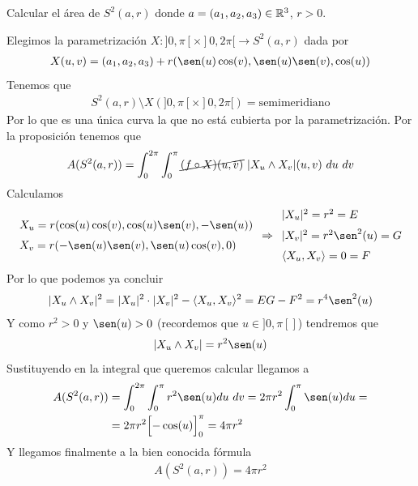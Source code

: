 \begin{ejemplo}
    Calcular el área de $S^2(a,r)$ donde $a=(a_1, a_2, a_3)\in \mathbb{R}^3$, $r>0$.\\
    \begin{solucion}
        Elegimos la parametrización $X:]0,\pi[\times]0,2\pi[ \to S^2(a,r)$ dada por
        \begin{gather*}
            X(u,v) = (a_1,a_2,a_3) + r(\sen(u)\cos(v), \sen(u)\sen(v), \cos(u))
        \end{gather*}
        Tenemos que 
        \begin{gather*}
            S^2(a,r) \setminus X(]0,\pi[\times]0,2\pi[) = \text{semimeridiano}
        \end{gather*}
        Por lo que es una única curva la que no está cubierta por la parametrización. Por la proposición tenemos que 
        \begin{gather*}
            A(S^2(a,r)) = \int_0^{2\pi} \int_0^{\pi} \cancel{(f\circ X)(u,v)}\ |X_u\wedge X_v|(u,v)\ du\ dv
        \end{gather*}
        Calculamos
        \begin{gather*}
            \begin{array}{l}
                X_u = r(\cos(u)\cos(v), \cos(u)\sen(v), -\sen(u))\\[0.6em]
                X_v = r(-\sen(u)\sen(v), \sen(u)\cos(v), 0)
            \end{array} \Rightarrow 
            \begin{array}{l}
                |X_u|^2 = r^2 = E\\[0.6em]
                |X_v|^2 = r^2\sen^2(u) = G\\[0.6em]
                \langle X_u, X_v \rangle = 0 = F
            \end{array}
        \end{gather*}
        Por lo que podemos ya concluir 
        \begin{gather*}
            |X_u\wedge X_v|^2 = |X_u|^2 \cdot |X_v|^2 - \langle X_u, X_v \rangle^2 = EG - F^2 = r^4\sen^2(u)
        \end{gather*}
        Y como $r^2>0$ y $\sen(u)>0$ (recordemos que $u\in]0,\pi[]$) tendremos que 
        \begin{gather*}
            |X_u\wedge X_v| = r^2 \sen(u)
        \end{gather*}
        Sustituyendo en la integral que queremos calcular llegamos a 
        \begin{align*}
            A(S^2(a,r)) &= 
            \int_0^{2\pi} \int_0^{\pi} r^2 \sen(u) du \ dv = 
            2\pi r^2 \int_0^{\pi} \sen(u) du = \\
            &=
            2\pi r^2 \Bigl[ -\cos(u)\Bigr]_0^{\pi} = 4\pi r^2
        \end{align*}
        Y llegamos finalmente a la bien conocida fórmula
        \begin{gather*}
            \boxed{A(S^2(a,r)) = 4\pi r^2}
        \end{gather*}
    \end{solucion}
\end{ejemplo}

